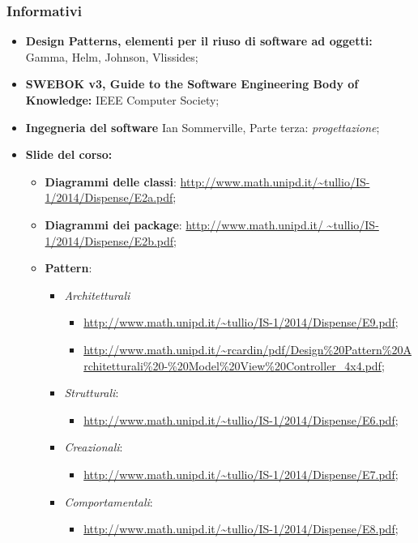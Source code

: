 \subsubsection{Informativi}
	\begin{itemize}
		\item \textbf{Design Patterns, elementi per il riuso di software ad oggetti:} Gamma, Helm, Johnson, Vlissides;
		\item \textbf{SWEBOK v3, Guide to the Software Engineering Body of Knowledge:} IEEE Computer Society;
		\item \textbf{Ingegneria del software} Ian Sommerville, Parte terza: \textit{progettazione};
		\item \textbf{Slide del corso:}
				\begin{itemize}
					\item \textbf{Diagrammi delle classi}: \url{http://www.math.unipd.it/~tullio/IS-1/2014/Dispense/E2a.pdf};
					\item \textbf{Diagrammi dei package}: \url{http://www.math.unipd.it/ ~tullio/IS-1/2014/Dispense/E2b.pdf};
					\item \textbf{Pattern}:
					\begin{itemize}
						\item \textit{Architetturali}
							\begin{itemize}
								\item \url{http://www.math.unipd.it/~tullio/IS-1/2014/Dispense/E9.pdf};
								\item \url{http://www.math.unipd.it/~rcardin/pdf/Design\%20Pattern\%20Architetturali\%20-\%20Model\%20View\%20Controller\_4x4.pdf};
							\end{itemize}
						\item \textit{Strutturali}:
						\begin{itemize}
						\item \url{http://www.math.unipd.it/~tullio/IS-1/2014/Dispense/E6.pdf};
						\end{itemize}
						\item \textit{Creazionali}:
						\begin{itemize}
						\item \url{http://www.math.unipd.it/~tullio/IS-1/2014/Dispense/E7.pdf};
						\end{itemize}
						\item \textit{Comportamentali}:
						\begin{itemize}
						\item \url{http://www.math.unipd.it/~tullio/IS-1/2014/Dispense/E8.pdf};

\end{itemize}
\end{itemize}
\end{itemize}
\end{itemize}
